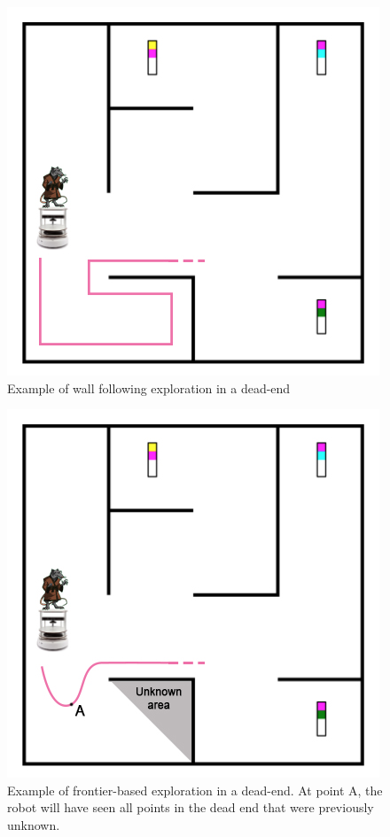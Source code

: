 \documentclass[titlepage,12pt,a4paper]{article}
\begin{document}
\begin{figure}
	\centering
	\includegraphics[scale=0.4]{wallfollowpath.jpg}
	\caption{Example of wall following exploration in a dead-end}
\end{figure}

\begin{figure}
	\centering
	\includegraphics[scale=0.4]{searchpath.jpg}
	\caption{Example of frontier-based exploration in a dead-end. At point A, the robot will have seen all points in the dead end that were previously unknown.}
\end{figure}
\end{document}
